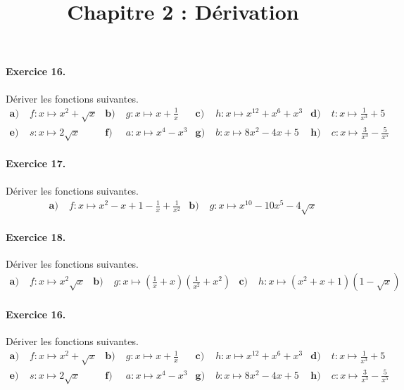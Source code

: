 \documentclass[11pt]{article}
\title{Chapitre 2 : Dérivation}
\date{}
\author{}
\begin{document}

\newcommand{\Cf}{\mathscr{C}_f}

\paragraph{Exercice 16.} Dériver les fonctions suivantes.
\begin{align*}
  \textbf{a)}\;& f:x\mapsto x^2+\sqrt x &
  \textbf{b)}\;& g:x\mapsto x+\frac{1}{x} &
  \textbf{c)}\;& h:x\mapsto x^{12}+x^{6}+x^3 &
  \textbf{d)}\;& t:x\mapsto \frac{1}{x^3} + 5 \\
  \textbf{e)}\;& s:x\mapsto 2\sqrt x &
  \textbf{f)}\;& a:x\mapsto x^4-x^3 &
  \textbf{g)}\;& b:x\mapsto 8x^2-4x+5 &
  \textbf{h)}\;& c:x\mapsto \frac{3}{x^3} - \frac{5}{x^5}
\end{align*}

\paragraph{Exercice 17.} Dériver les fonctions suivantes.
\begin{align*}
  \textbf{a)}\;& f:x\mapsto x^2-x+1-\frac{1}{x}+\frac{1}{x^2} &
  \textbf{b)}\;& g:x\mapsto x^{10}-10x^5-4\sqrt x
\end{align*}

\paragraph{Exercice 18.} Dériver les fonctions suivantes.
\begin{align*}
  \textbf{a)}\;& f:x\mapsto x^2\sqrt{x} &
  \textbf{b)}\;& g:x\mapsto
  \left(\frac{1}{x}+x\right)\left(\frac{1}{x^2}+x^2\right) &
  \textbf{c)}\;& h:x\mapsto (x^2+x+1)(1-\sqrt{x})
\end{align*}
\vspace{2cm}
\paragraph{Exercice 16.} Dériver les fonctions suivantes.
\begin{align*}
  \textbf{a)}\;& f:x\mapsto x^2+\sqrt x &
  \textbf{b)}\;& g:x\mapsto x+\frac{1}{x} &
  \textbf{c)}\;& h:x\mapsto x^{12}+x^{6}+x^3 &
  \textbf{d)}\;& t:x\mapsto \frac{1}{x^3} + 5 \\
  \textbf{e)}\;& s:x\mapsto 2\sqrt x &
  \textbf{f)}\;& a:x\mapsto x^4-x^3 &
  \textbf{g)}\;& b:x\mapsto 8x^2-4x+5 &
  \textbf{h)}\;& c:x\mapsto \frac{3}{x^3} - \frac{5}{x^5}
\end{align*}
\end{document}
